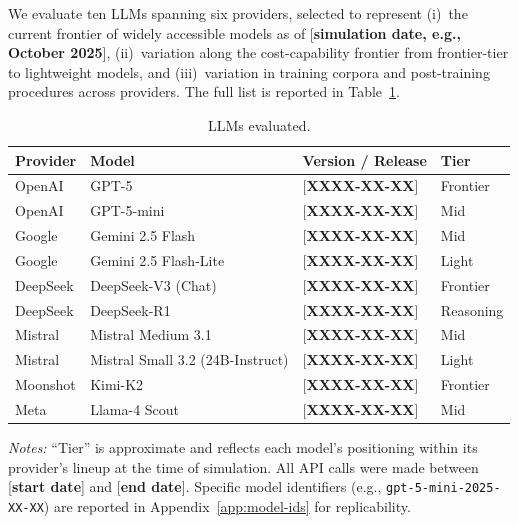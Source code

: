 \documentclass[12pt]{article}
\begin{document}
We evaluate ten LLMs spanning six providers, selected to represent (i)~the current frontier of widely accessible models as of [\textbf{simulation date, e.g., October 2025}], (ii)~variation along the cost-capability frontier from frontier-tier to lightweight models, and (iii)~variation in training corpora and post-training procedures across providers. The full list is reported in Table~\ref{tab:models}.

\begin{table}[h]
    \centering
    \caption{LLMs evaluated.}
    \label{tab:models}
    \begin{threeparttable}
    \begin{tabular}{llll}
        \toprule
        Provider & Model & Version / Release & Tier \\
        \midrule
        OpenAI    & GPT-5                     & [\textbf{XXXX-XX-XX}] & Frontier \\
        OpenAI    & GPT-5-mini                & [\textbf{XXXX-XX-XX}] & Mid \\
        Google    & Gemini 2.5 Flash          & [\textbf{XXXX-XX-XX}] & Mid \\
        Google    & Gemini 2.5 Flash-Lite     & [\textbf{XXXX-XX-XX}] & Light \\
        DeepSeek  & DeepSeek-V3 (Chat)        & [\textbf{XXXX-XX-XX}] & Frontier \\
        DeepSeek  & DeepSeek-R1               & [\textbf{XXXX-XX-XX}] & Reasoning \\
        Mistral   & Mistral Medium 3.1        & [\textbf{XXXX-XX-XX}] & Mid \\
        Mistral   & Mistral Small 3.2 (24B-Instruct) & [\textbf{XXXX-XX-XX}] & Light \\
        Moonshot  & Kimi-K2                   & [\textbf{XXXX-XX-XX}] & Frontier \\
        Meta      & Llama-4 Scout             & [\textbf{XXXX-XX-XX}] & Mid \\
        \bottomrule
    \end{tabular}
    \begin{tablenotes}\footnotesize
    \item \textit{Notes:} ``Tier'' is approximate and reflects each model's positioning within its provider's lineup at the time of simulation. All API calls were made between [\textbf{start date}] and [\textbf{end date}]. Specific model identifiers (e.g., \texttt{gpt-5-mini-2025-XX-XX}) are reported in Appendix~\ref{app:model-ids} for replicability.
    \end{tablenotes}
    \end{threeparttable}
\end{table}
\end{document}
